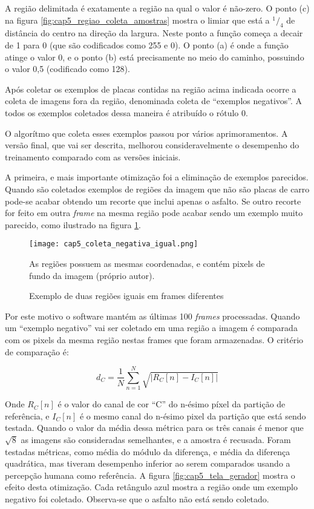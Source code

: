 A região delimitada é exatamente a região na qual o valor é não-zero. O ponto
(c) na figura \ref{fig:cap5_regiao_coleta_amostras} mostra o limiar que está
a $^1/_4$ de distância do centro na direção da largura. Neste ponto a função
começa a decair de 1 para 0 (que são codificados como 255 e 0). O ponto (a)
é onde a função atinge o valor 0, e o ponto (b) está precisamente no
meio do caminho, possuindo o valor 0,5 (codificado como 128).

Após coletar os exemplos de placas contidas na região acima indicada ocorre a
coleta de imagens fora da região, denominada coleta de “exemplos negativos”. A
todos os exemplos coletados dessa maneira é atribuído o rótulo 0.

O algorítmo que coleta esses exemplos passou por vários aprimoramentos. A
versão final, que vai ser descrita, melhorou consideravelmente o desempenho do
treinamento comparado com as versões iniciais.

A primeira, e mais importante otimização foi a eliminação de exemplos
parecidos. Quando são coletados exemplos de regiões da imagem que não são
placas de carro pode-se acabar obtendo um recorte que inclui apenas o asfalto.
Se outro recorte for feito em outra \emph{frame} na mesma região pode acabar
sendo um exemplo muito parecido, como ilustrado na figura
\ref{fig:cap5_coleta_negativa_igual}.

\begin{figure}[!htb]
	\centering
	\texttt{[image: cap5\_coleta\_negativa\_igual.png]}
	\caption{Exemplo de duas regiões iguais em frames diferentes}
	\label{fig:cap5_coleta_negativa_igual}
	As regiões possuem as mesmas coordenadas, e contém pixels de fundo da
	imagem (próprio autor).
\end{figure}

Por este motivo o software mantém as últimas 100 \emph{frames} processadas.
Quando um “exemplo negativo” vai ser coletado em uma região a imagem é
comparada com os
pixels da mesma região nestas frames que foram armazenadas. O critério de
comparação é:

\begin{equation}
	d_C=\frac{1}{N} \sum_{n=1}^N \sqrt{\left| R_C [n] -I_C [n] \right|}
\end{equation}

Onde $R_C[n]$ é o valor do canal de cor “C” do n-ésimo píxel da partição de
referência, e $I_C[n]$ é o mesmo canal do n-ésimo pixel da
partição que está sendo testada. Quando o valor da média dessa métrica
para os três canais é menor que $\sqrt{8}$ as imagens são consideradas
semelhantes, e a amostra é recusada. Foram
testadas métricas, como média do módulo da diferença, e média da diferença
quadrática, mas tiveram desempenho inferior ao serem comparados usando a
percepção humana como referência. A figura
\ref{fig:cap5_tela_gerador} mostra o efeito desta otimização.
Cada retângulo azul mostra a região onde um exemplo negativo foi coletado.
Observa-se que o asfalto não está sendo coletado.

